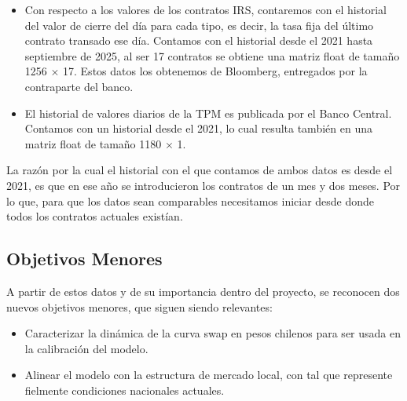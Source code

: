\begin{itemize}
    \item Con respecto a los valores de los contratos IRS, contaremos con el historial del valor de cierre del día para cada tipo, es decir, la tasa fija del último contrato transado ese día. Contamos con el historial desde el 2021 hasta septiembre de 2025, al ser 17 contratos se obtiene una matriz float de tamaño 1256 $\times$ 17. Estos datos los obtenemos de Bloomberg, entregados por la contraparte del banco.
    \item El historial de valores diarios de la TPM es publicada por el Banco Central. Contamos con un historial desde el 2021, lo cual resulta también en una matriz float de tamaño 1180 $\times$ 1.
\end{itemize}

\qquad La razón por la cual el historial con el que contamos de ambos datos es desde el 2021, es que en ese año se introducieron los contratos de un mes y dos meses. Por lo que, para que los datos sean comparables necesitamos iniciar desde donde todos los contratos actuales existían.

\subsection{Objetivos Menores}

\qquad A partir de estos datos y de su importancia dentro del proyecto, se reconocen dos nuevos objetivos menores, que siguen siendo relevantes:

\begin{itemize}
    \item Caracterizar la dinámica de la curva swap en pesos chilenos para ser usada en la calibración del modelo.
    \item Alinear el modelo con la estructura de mercado local, con tal que represente fielmente condiciones nacionales actuales.
\end{itemize}